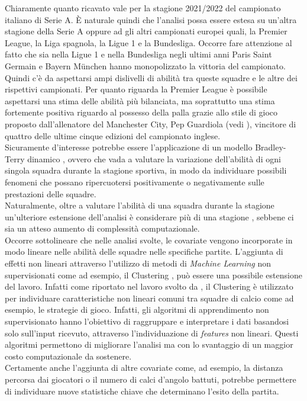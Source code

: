 Chiaramente quanto ricavato vale per la stagione 2021/2022 del campionato italiano di Serie A. È naturale quindi che l'analisi possa essere estesa su un’altra stagione della Serie A oppure ad gli altri campionati europei quali, la Premier League, la Liga spagnola, la Ligue 1 e la Bundesliga. Occorre fare attenzione al fatto che sia nella Ligue 1 e nella Bundesliga negli ultimi anni Paris Saint Germain e Bayern München hanno monopolizzato la vittoria del campionato. Quindi c'è da aspettarsi ampi dislivelli di abilità tra queste squadre e le altre dei rispettivi campionati. Per quanto riguarda la Premier League è possibile aspettarsi una stima delle abilità più bilanciata, ma soprattutto una stima fortemente positiva riguardo al possesso della palla grazie allo stile di gioco proposto dall'allenatore del Manchester City, Pep Guardiola (vedi \textit{\cite{futbol}}), vincitore di quattro delle ultime cinque edizioni del campionato inglese.\\
Sicuramente d'interesse potrebbe essere l'applicazione di un modello Bradley-Terry dinamico \autocite{cattelan2013dynamic}, ovvero che vada a valutare la variazione dell'abilità di ogni singola squadra durante la stagione sportiva, in modo da individuare possibili fenomeni che possano ripercuotersi positivamente o negativamente sulle prestazioni delle squadre.\\
Naturalmente, oltre a valutare l'abilità di una squadra durante la stagione un'ulteriore estensione dell'analisi è considerare più di una stagione \autocite{tsokos2019modeling}, sebbene ci sia un atteso aumento di complessità computazionale. \\
Occorre sottolineare che nelle analisi svolte, le covariate vengono incorporate in modo lineare nelle abilità delle squadre nelle specifiche partite. L'aggiunta di effetti non lineari attraverso l'utilizzo di metodi di \emph{Machine Learning} non supervisionati come ad esempio, il Clustering \autocite{dunn1974well}, può essere una possibile estensione del lavoro. Infatti come riportato nel lavoro svolto da \textcite{shin2014novel}, il Clustering è utilizzato per individuare caratteristiche non lineari comuni tra squadre di calcio come ad esempio, le strategie di gioco. Infatti, gli algoritmi di apprendimento non supervisionato hanno l'obiettivo di raggruppare e interpretare i dati basandosi solo sull'input ricevuto, attraverso l'individuazione di \emph{features} non lineari. Questi algoritmi permettono di migliorare l'analisi ma con lo svantaggio di un maggior costo computazionale da sostenere.\\
Certamente anche l'aggiunta di altre covariate come, ad esempio, la distanza percorsa dai giocatori o il numero di calci d'angolo battuti, potrebbe permettere di individuare nuove statistiche chiave che determinano l'esito della partita.\\

